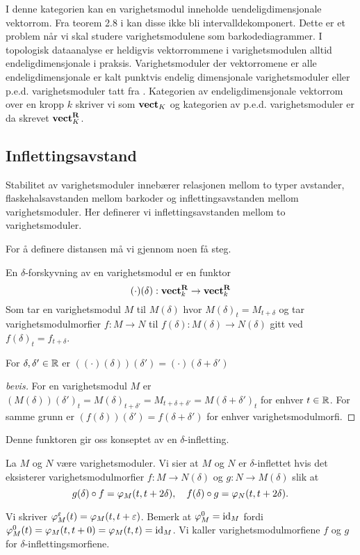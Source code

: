 I denne kategorien kan en varighetsmodul inneholde uendeligdimensjonale vektorrom. Fra teorem 2.8 i \cite{Chazal2016} kan disse ikke bli intervalldekomponert. Dette er et problem når vi skal studere varighetsmodulene som barkodediagrammer. I topologisk dataanalyse er heldigvis vektorrommene i varighetsmodulen alltid endeligdimensjonale i praksis. Varighetsmoduler der vektorromene er alle endeligdimensjonale er kalt punktvis endelig dimensjonale varighetsmoduler eller p.e.d. varighetsmoduler tatt fra \cite{Bauer2015a}. Kategorien av endeligdimensjonale vektorrom over en kropp $k$ skriver vi som $\textnormal{\textbf{vect}}_K$ og kategorien av p.e.d. varighetsmoduler er da skrevet $\textnormal{\textbf{vect}}_K^{\textnormal{\textbf{{R}}}}$.

\subsection{Inflettingsavstand}
Stabilitet av varighetsmoduler innebærer relasjonen mellom to typer avstander, flaskehalsavstanden mellom barkoder
og inflettingsavstanden mellom varighetsmoduler. Her definerer vi inflettingsavstanden mellom to varighetsmoduler.

For å definere distansen må vi gjennom noen få steg.
\begin{definisjon}\label{Def:DShift}
	En $\delta$-forskyvning av en varighetsmodul er en funktor
	\[(\cdot)(\delta): \textnormal{\textbf{vect}}_k^{\textnormal{\textbf{R}}}\to \textnormal{\textbf{vect}}_k^{\textnormal{\textbf{R}}}\]
	Som tar en varighetsmodul $M$ til $M(\delta)$ hvor $M(\delta)_t = M_{t+\delta}$ og tar varighetsmodulmorfier $f:M\to N$ til $f(\delta):M(\delta)\to N(\delta)$ gitt ved $f(\delta)_t=f_{t+\delta}$.
\end{definisjon}

\begin{korollar}\label{kor:Shiftpluss}
For $\delta,\delta'\in\mathbb{R}$ er $((\cdot)(\delta))(\delta')=(\cdot)(\delta+\delta')$
\end{korollar}
\begin{proof}[bevis]
For en varighetsmodul $M$ er $(M(\delta))(\delta')_t=M(\delta)_{t+\delta'}=M_{t+\delta+\delta'}=M(\delta+\delta')_t$ for enhver $t\in\mathbb{R}$. For samme grunn er $(f(\delta))(\delta')=f(\delta+\delta'
)$ for enhver varighetsmodulmorfi.
\end{proof}

Denne funktoren gir oss konseptet av en $\delta$-infletting.

\begin{definisjon}\label{Def:infletting}
	La $M$ og $N$ være varighetsmoduler. Vi sier at $M$ og $N$ er $\delta$-inflettet hvis det eksisterer varighetsmodulmorfier $f:M\to N(\delta)$ og $g:N\to M(\delta)$ slik at
	\[g(\delta)\circ f = \varphi_M(t,t+2\delta),\quad f(\delta)\circ g = \varphi_N(t,t+2\delta).\]
\end{definisjon}
Vi skriver $\varphi^\varepsilon_M(t) = \varphi_M(t,t+\varepsilon)$. Bemerk at $\varphi^0_M=\textnormal{id}_M$ fordi $\varphi^0_M(t) = \varphi_M(t,t+0)=\varphi_M(t,t)=\textnormal{id}_M$. Vi kaller varighetsmodulmorfiene $f$ og $g$ for $\delta$-inflettingsmorfiene.


